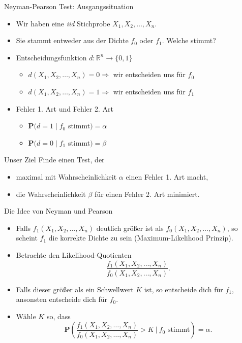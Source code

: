 \documentclass[t,11pt]{beamer}
\begin{document}
\begin{frame}
\begin{alertblock}{Neyman-Pearson Test: Ausgangssituation}
	\begin{itemize}%
		\item Wir haben eine \textit{iid} Stichprobe $X_1,X_2,\dots,X_n$.
		\item Sie stammt entweder aus der Dichte $f_0$ oder $f_1$. Welche stimmt?
		\item Entscheidungsfunktion $d:\mathbb{R}^n\to\{0,1 \}$
		\begin{itemize}
			\item $d(X_1,X_2,\dots,X_n)=0\Rightarrow$ wir entscheiden uns für $f_0$
			\item $d(X_1,X_2,\dots,X_n)=1\Rightarrow$ wir entscheiden uns für $f_1$
		\end{itemize}
		\item Fehler 1. Art und Fehler 2. Art
		\begin{itemize}
			\item $\mathbf{P}(d=1\mid f_0$ stimmt$)=\alpha$
			\item $\mathbf{P}(d=0\mid f_1$ stimmt$)=\beta$
		\end{itemize}
	\end{itemize}
\end{alertblock}
\begin{exampleblock}{Unser Ziel}
	Finde einen Test, der 
	\begin{itemize}
		\item maximal mit Wahrscheinlichkeit $\alpha$ einen Fehler 1. Art macht,
		\item die Wahrscheinlichkeit $\beta$ für einen Fehler 2. Art minimiert.
	\end{itemize}
\end{exampleblock}
\end{frame}

\begin{frame}
	\begin{alertblock}{Die Idee von Neyman und Pearson}
		\begin{itemize}[<+->]
			\item Falls $f_1(X_1,X_2,\dots,X_n)$ deutlich größer ist als $f_0(X_1,X_2,\dots,X_n)$, so scheint $f_1$ die korrekte Dichte zu sein (Maximum-Likelihood Prinzip).
			\item Betrachte den Likelihood-Quotienten $$\frac{f_1(X_1,X_2,\dots,X_n)}{f_0(X_1,X_2,\dots,X_n)}.$$
			\item Falls dieser größer als ein Schwellwert $K$ ist, so entscheide dich für $f_1$, ansonsten entscheide dich für $f_0$.
			\item Wähle $K$ so, dass
			$$ \mathbf{P}\left(\frac{f_1(X_1,X_2,\dots,X_n)}{f_0(X_1,X_2,\dots,X_n)}>K~\bigg\vert~ f_0\text{ stimmt}\right)=\alpha .$$
		\end{itemize}
	\end{alertblock}
\end{frame}
\end{document}
